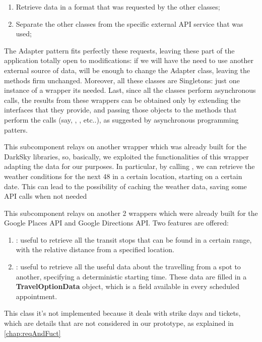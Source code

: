 \begin{enumerate}
\item Retrieve data in a format that was requested by the other classes;
\item Separate the other classes from the specific external API service that was used;
\end{enumerate}

The Adapter pattern fits perfectly these requests, leaving these part of the application totally open to modifications: if we will have the need to use another external source of data, will be enough to change the Adapter class, leaving the methods firm unchanged.
Moreover, all these classes are Singletons: just one instance of a wrapper its needed.
Last, since all the classes perform asynchronous calls, the results from these wrappers can be obtained only by extending the interfaces that they provide, and passing those objects to the methods that perform the calls (say, , , etc..), as suggested by asynchronous programming patters.

This subcomponent relays on another wrapper which was already built for the DarkSky libraries, so, basically, we exploited the functionalities of this wrapper adapting the data for our purposes. In particular, by calling , we can retrieve the weather conditions for the next 48 in a certain location, starting on a certain date. This can lead to the possibility of caching the weather data, saving some API calls when not needed

This subcomponent relays on another 2 wrappers which were already built for the Google Places API and Google Directions API. Two features are offered:

\begin{enumerate}
\item {}: useful to retrieve all the transit stops that can be found in a certain range, with the relative distance from a specified location.
\item {}: useful to retrieve all the useful data about the travelling from a spot to another, specifying a deterministic starting time. These data are filled in a \textbf{TravelOptionData} object, which is a field available in every scheduled appointment.
\end{enumerate}

This class it's not implemented because it deals with strike days and tickets, which are details that are not considered in our prototype, as explained in \ref{chap:reqAndFuct}

